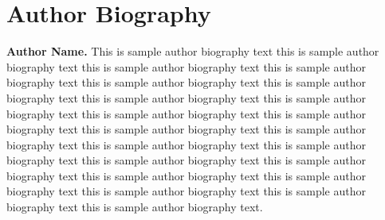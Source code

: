 \documentclass[AMA]{WileyNJD-v1}
\begin{document}
\section*{Author Biography}

\begin{biography}{
}{\textbf{Author Name.} 
This is sample author biography text this is sample author biography text this is sample author biography text this is sample author biography text this is sample author biography text this is sample author biography text this is sample author biography text this is sample author biography text this is sample author biography text this is sample author biography text this is sample author biography text this is sample author biography text this is sample author biography text this is sample author biography text this is sample author biography text this is sample author biography text this is sample author biography text this is sample author biography text this is sample author biography text this is sample author biography text this is sample author biography text.}
\end{biography}
\end{document}
